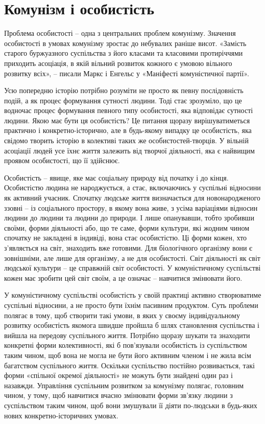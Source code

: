 \documentclass[../main]{subfiles}
\begin{document}
\ifSubfilesClassLoaded{\setcounter{page}{47}}{}
\section{Комунізм і особистість}
\label{sec:08_kommunizm_lichnost}

Проблема особистості – одна з центральних проблем комунізму. Значення особистості в умовах комунізму зростає до небувалих раніше висот. «Замість старого буржуазного суспільства з його класами та класовими протиріччями приходить асоціація, в якій вільний розвиток кожного є умовою вільного розвитку всіх», – писали Маркс і Енгельс у «Маніфесті комуністичної партії».

Усю попередню історію потрібно розуміти не просто як певну послідовність подій, а як процес формування сутності людини. Тоді стає зрозуміло, що це водночас процес формування певного типу особистості, яка відповідає сутності людини. Якою має бути ця особистість? Це питання щоразу вирішуватиметься практично і конкретно-історично, але в будь-якому випадку це особистість, яка свідомо творить історію в колективі таких же особистостей-творців. У вільній асоціації людей усе їхнє життя залежить від творчої діяльності, яка є найвищим проявом особистості, що її здійснює.

Особистість – явище, яке має соціальну природу від початку і до кінця. Особистістю людина не народжується, а стає, включаючись у суспільні відносини як активний учасник. Спочатку людське життя визначається для новонародженого ззовні – із соціального простору, в якому вона живе, з усіма варіаціями відносин людини до людини та людини до природи. І лише опанувавши, тобто зробивши своїми, форми діяльності або, що те саме, форми культури, які жодним чином спочатку не закладені в індивіді, вона стає особистістю. Ці форми кожен, хто з’являється на світ, знаходить вже готовими. Для біологічного організму вони є зовнішніми, але лише для організму, а не для особистості. Світ діяльності як світ людської культури – це справжній світ особистості. У комуністичному суспільстві кожен має зробити цей світ своїм, а це означає – навчитися змінювати його.

У комуністичному суспільстві особистість у своїй практиці активно створюватиме суспільні відносини, а не просто бути їхнім пасивним продуктом. Суть проблеми полягає в тому, щоб створити такі умови, в яких у своєму індивідуальному розвитку особистість якомога швидше пройшла б шлях становлення суспільства і вийшла на передову суспільного життя. Потрібно щоразу шукати та знаходити конкретні форми колективності, які б пов’язували особистість із суспільством таким чином, щоб вона не могла не бути його активним членом і не жила всім багатством суспільного життя. Оскільки суспільство постійно розвивається, такі форми «спільної окремої діяльності» не можуть бути знайдені один раз і назавжди. Управління суспільним розвитком за комунізму полягає, головним чином, у тому, щоб навчитися вчасно змінювати форми зв’язку людини з суспільством таким чином, щоб вони змушували її діяти по-людськи в будь-яких нових конкретно-історичних умовах.
\end{document}

